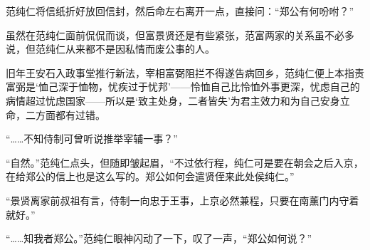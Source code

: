 范纯仁将信纸折好放回信封，然后命左右离开一点，直接问：“郑公有何吩咐？”

虽然在范纯仁面前侃侃而谈，但富景贤还是有些紧张，范富两家的关系虽不必多说，但范纯仁从来都不是因私情而废公事的人。

旧年王安石入政事堂推行新法，宰相富弼阻拦不得遂告病回乡，范纯仁便上本指责富弼是‘恤己深于恤物，忧疾过于忧邦’——怜恤自己比怜恤外事更深，忧虑自己的病情超过忧虑国家——所以是‘致主处身，二者皆失’为君主效力和为自己安身立命，二方面都有过错。

“……不知侍制可曾听说推举宰辅一事？”

“自然。”范纯仁点头，但随即皱起眉，“不过依行程，纯仁可是要在朝会之后入京，在给郑公的信上也是这么写的。郑公如何会遣贤侄来此处侯纯仁。”

“景贤离家前叔祖有言，侍制一向忠于王事，上京必然兼程，只要在南薰门内守着就好。”

“……知我者郑公。”范纯仁眼神闪动了一下，叹了一声，“郑公如何说？”

